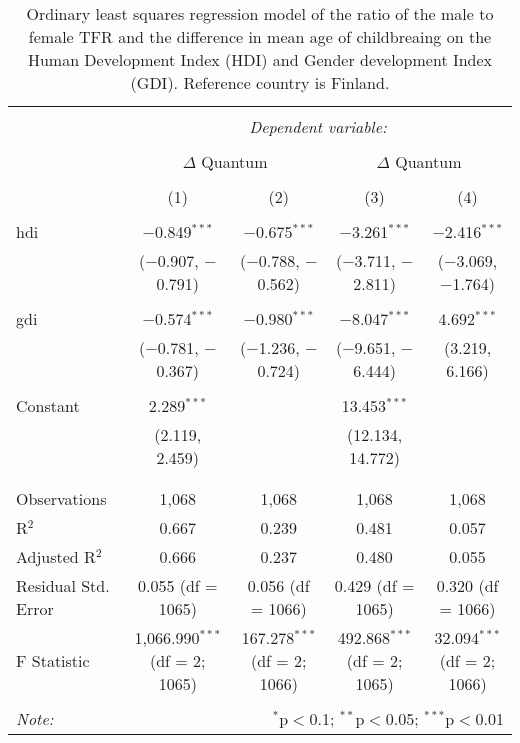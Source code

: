 
\begin{table}[!htbp] \centering 
  \caption{Ordinary least squares regression model of the ratio of the male to female TFR and the difference in mean age of childbreaing on the Human Development Index (HDI) and Gender development Index (GDI). Reference country is Finland.} 
  \label{mod: control} 
\begin{tabular}{@{\extracolsep{5pt}}lcccc} 
\\[-1.8ex]\hline 
\hline \\[-1.8ex] 
 & \multicolumn{4}{c}{\textit{Dependent variable:}} \\ 
\cline{2-5} 
\\[-1.8ex] & \multicolumn{2}{c}{$\Delta$ Quantum} & \multicolumn{2}{c}{$\Delta$ Quantum} \\ 
\\[-1.8ex] & (1) & (2) & (3) & (4)\\ 
\hline \\[-1.8ex] 
 hdi & $-$0.849$^{***}$ & $-$0.675$^{***}$ & $-$3.261$^{***}$ & $-$2.416$^{***}$ \\ 
  & ($-$0.907, $-$0.791) & ($-$0.788, $-$0.562) & ($-$3.711, $-$2.811) & ($-$3.069, $-$1.764) \\ 
  & & & & \\ 
 gdi & $-$0.574$^{***}$ & $-$0.980$^{***}$ & $-$8.047$^{***}$ & 4.692$^{***}$ \\ 
  & ($-$0.781, $-$0.367) & ($-$1.236, $-$0.724) & ($-$9.651, $-$6.444) & (3.219, 6.166) \\ 
  & & & & \\ 
 Constant & 2.289$^{***}$ &  & 13.453$^{***}$ &  \\ 
  & (2.119, 2.459) &  & (12.134, 14.772) &  \\ 
  & & & & \\ 
\hline \\[-1.8ex] 
Observations & 1,068 & 1,068 & 1,068 & 1,068 \\ 
R$^{2}$ & 0.667 & 0.239 & 0.481 & 0.057 \\ 
Adjusted R$^{2}$ & 0.666 & 0.237 & 0.480 & 0.055 \\ 
Residual Std. Error & 0.055 (df = 1065) & 0.056 (df = 1066) & 0.429 (df = 1065) & 0.320 (df = 1066) \\ 
F Statistic & 1,066.990$^{***}$ (df = 2; 1065) & 167.278$^{***}$ (df = 2; 1066) & 492.868$^{***}$ (df = 2; 1065) & 32.094$^{***}$ (df = 2; 1066) \\ 
\hline 
\hline \\[-1.8ex] 
\textit{Note:}  & \multicolumn{4}{r}{$^{*}$p$<$0.1; $^{**}$p$<$0.05; $^{***}$p$<$0.01} \\ 
\end{tabular} 
\end{table} 
